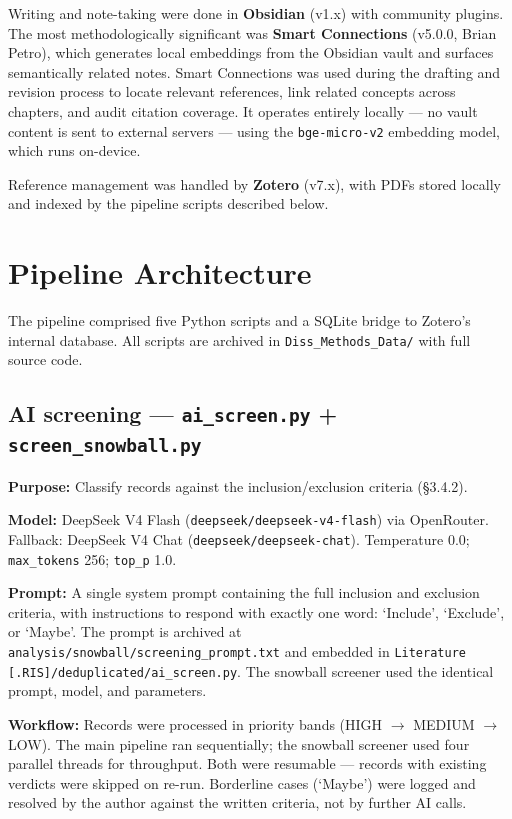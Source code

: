 Writing and note-taking were done in \textbf{Obsidian} (v1.x) with community plugins. The most methodologically significant was \textbf{Smart Connections} (v5.0.0, Brian Petro), which generates local embeddings from the Obsidian vault and surfaces semantically related notes. Smart Connections was used during the drafting and revision process to locate relevant references, link related concepts across chapters, and audit citation coverage. It operates entirely locally --- no vault content is sent to external servers --- using the \texttt{bge-micro-v2} embedding model, which runs on-device.

Reference management was handled by \textbf{Zotero} (v7.x), with PDFs stored locally and indexed by the pipeline scripts described below.

\section{Pipeline Architecture}

The pipeline comprised five Python scripts and a SQLite bridge to Zotero's internal database. All scripts are archived in \texttt{Diss\_Methods\_Data/} with full source code.

\subsection{AI screening --- \texttt{ai\_screen.py} + \texttt{screen\_snowball.py}}

\textbf{Purpose:} Classify records against the inclusion/exclusion criteria (\S 3.4.2).

\textbf{Model:} DeepSeek V4 Flash (\texttt{deepseek/deepseek-v4-flash}) via OpenRouter. Fallback: DeepSeek V4 Chat (\texttt{deepseek/\allowbreak deepseek-chat}). Temperature 0.0; \texttt{max\_tokens} 256; \texttt{top\_p} 1.0.

\textbf{Prompt:} A single system prompt containing the full inclusion and exclusion criteria, with instructions to respond with exactly one word: `Include', `Exclude', or `Maybe'. The prompt is archived at \texttt{analysis/snowball/screening\_prompt.txt} and embedded in \texttt{Literature [.RIS]/deduplicated/ai\_screen.py}. The snowball screener used the identical prompt, model, and parameters.

\textbf{Workflow:} Records were processed in priority bands (HIGH $\rightarrow$ MEDIUM $\rightarrow$ LOW). The main pipeline ran sequentially; the snowball screener used four parallel threads for throughput. Both were resumable --- records with existing verdicts were skipped on re-run. Borderline cases (`Maybe') were logged and resolved by the author against the written criteria, not by further AI calls.

